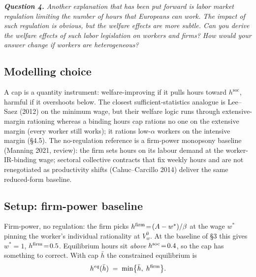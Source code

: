 \documentclass[9pt,a4paper]{extarticle}
\begin{document}
\begingroup\small\itshape\noindent\textbf{Question 4.} Another
explanation that has been put forward is labor market regulation
limiting the number of hours that Europeans can work. The impact
of such regulation is obvious, but the welfare effects are more
subtle. Can you derive the welfare effects of such labor
legislation on workers and firms? How would your answer change if
workers are heterogeneous?\endgroup

\subsection{Modelling choice}
A cap is a quantity instrument: welfare-improving if it pulls hours
toward $h^\text{soc}$, harmful if it overshoots below. The closest
sufficient-statistics analogue is Lee--Saez (2012) on the minimum
wage, but their welfare logic runs through extensive-margin rationing
whereas a binding hours cap rations no one on the extensive margin
(every worker still works); it rations low-$\alpha$ workers on the
intensive margin (\S 4.5). The no-regulation reference is a
firm-power monopsony baseline (Manning 2021, review): the firm sets
hours on its labour demand at the worker-IR-binding wage; sectoral
collective contracts that fix weekly hours and are not renegotiated
as productivity shifts (Cahuc--Carcillo 2014) deliver the same
reduced-form baseline.

\subsection{Setup: firm-power baseline}
Firm-power, no regulation: the firm picks
$h^{\rm firm}\!=\!(A-w^*)/\beta$ at the wage $w^*$ pinning the
worker's individual rationality at $V_w^0$. At the baseline of \S 3
this gives $w^*\!=\!1$, $h^{\rm firm}\!=\!0.5$. Equilibrium hours
sit \emph{above} $h^{\rm soc}\!=\!0.4$, so the cap has something to
correct. With cap $\bar h$ the constrained equilibrium is
\[
h^{eq}(\bar h)\;=\;\min\bigl\{\bar h,\;h^{\rm firm}\bigr\}.
\]
\end{document}
